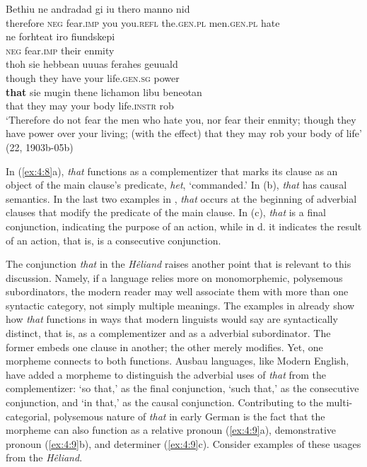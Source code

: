 \ex
\gll Bethiu    ne   andradad  gi   iu       thero    manno    nid\\
therefore  \textsc{neg}   fear.\textsc{imp}    you   you.\textsc{refl}  the.\textsc{gen.pl}   men.\textsc{gen.pl}  hate\\

\gll ne    forhteat   iro      fiundskepi\\
\textsc{neg}   fear.\textsc{imp}    their  enmity\\

\gll thoh   sie     hebbean      uuuas ferahes   geuuald\\
though  they    have    your life.\textsc{gen.sg}  power\\

\gll \textbf{that}    sie     mugin  thene  lichamon  libu     beneotan\\
that    they    may    your  body    life.\textsc{instr}  rob\\
\glt ‘Therefore do not fear the men who hate you, nor fear their enmity; though they have power over your living; (with the effect) that they may rob your body of life’ (22, 1903b-05b)
    \z
\z

\noindent In (\ref{ex:4:8}a), \textit{that} functions as a complementizer that marks its clause as an object of the main clause’s predicate, \textit{het}, ‘commanded.’ In (b), \textit{that} has causal semantics. In the last two examples in , \textit{that} occurs at the beginning of adverbial clauses that modify the predicate of the main clause. In (c), \textit{that} is a final conjunction, indicating the purpose of an action, while in d. it indicates the result of an action, that is, is a consecutive conjunction.

The conjunction \textit{that} in the \textit{Hêliand} raises another point that is relevant to this discussion. Namely, if a language relies more on monomorphemic, polysemous subordinators, the modern reader may well associate them with more than one syntactic category, not simply multiple meanings. The examples in  already show how \textit{that} functions in ways that modern linguists would say are syntactically distinct, that is, as a complementizer and as a adverbial subordinator. The former embeds one clause in another; the other merely modifies. Yet, one morpheme connects to both functions. Ausbau languages, like Modern English, have added a morpheme to distinguish the adverbial uses of \textit{that} from the complementizer: ‘so that,’ as the final conjunction, ‘such that,’ as the consecutive conjunction, and ‘in that,’ as the causal conjunction. Contributing to the multi-categorial, polysemous nature of \textit{that} in early German is the fact that the morpheme can also function as a relative pronoun (\ref{ex:4:9}a), demonstrative pronoun (\ref{ex:4:9}b), and determiner (\ref{ex:4:9}c). Consider examples of these usages from the \textit{Hêliand}.

